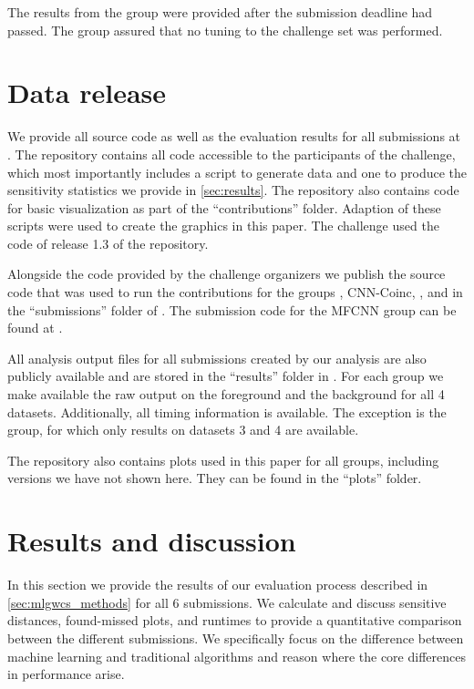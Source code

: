 The results from the \cwb group were provided after the submission deadline had passed. The group assured that no tuning to the challenge set was performed.


\section{Data release}
We provide all source code as well as the evaluation results for all submissions at \cite{github}. The repository contains all code accessible to the participants of the challenge, which most importantly  includes a script to generate data and one to produce the sensitivity statistics we provide in \autoref{sec:results}. The repository also contains code for basic visualization as part of the ``contributions'' folder. Adaption of these scripts were used to create the graphics in this paper. The challenge used the code of release 1.3 of the repository.

Alongside the code provided by the challenge organizers we publish the source code that was used to run the contributions for the groups \pycbc, CNN-Coinc, \jena, and \virgo in the ``submissions'' folder of \cite{github}. The submission code for the MFCNN group can be found at \cite{Wang:2022aaa}.

All analysis output files for all submissions created by our analysis are also publicly available and are stored in the ``results'' folder in \cite{github}. For each group we make available the raw output on the foreground and the background for all 4 datasets. Additionally, all timing information is available. The exception is the \cwb group, for which only results on datasets 3 and 4 are available. 

The repository \cite{github} also contains plots used in this paper for all groups, including versions we have not shown here. They can be found in the ``plots'' folder.


\section{Results and discussion}\label{sec:results}
In this section we provide the results of our evaluation process described in \autoref{sec:mlgwcs_methods} for all $6$ submissions. We calculate and discuss sensitive distances, found-missed plots, and runtimes to provide a quantitative comparison between the different submissions. We specifically focus on the difference between machine learning and traditional algorithms and reason where the core differences in performance arise.

